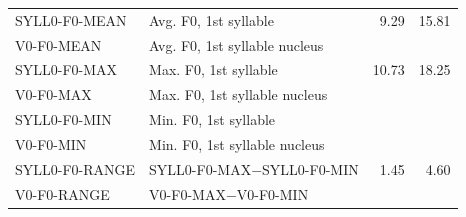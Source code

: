 \begin{table}[h!]
{\begin{subtable}[h]{\textwidth}
\begin{tabularx}{\textwidth}{p{}Xrr}
		SYLL0-F0-MEAN	& Avg. F0, 1st syllable					& 9.29		& 15.81\\	
		V0-F0-MEAN		& Avg. F0, 1st syllable	nucleus				& \color{red}{TD}		& \color{red}{TD}\\
		SYLL0-F0-MAX		& Max. F0, 1st syllable					& 10.73		& 18.25\\
		V0-F0-MAX		& Max. F0, 1st syllable	nucleus				& \color{red}{TD}		& \color{red}{TD}\\
		SYLL0-F0-MIN		& Min. F0, 1st syllable					& \color{red}{TD}		& \color{red}{TD}\\
		V0-F0-MIN		& Min. F0, 1st syllable	nucleus				& \color{red}{TD}		& \color{red}{TD}\\
		SYLL0-F0-RANGE & SYLL0-F0-MAX$-$SYLL0-F0-MIN	& 1.45		& 4.60\\
		V0-F0-RANGE		& V0-F0-MAX$-$V0-F0-MIN				& \color{red}{TD}		& \color{red}{TD}\\


\end{tabularx}
\end{subtable}}
\end{table}
